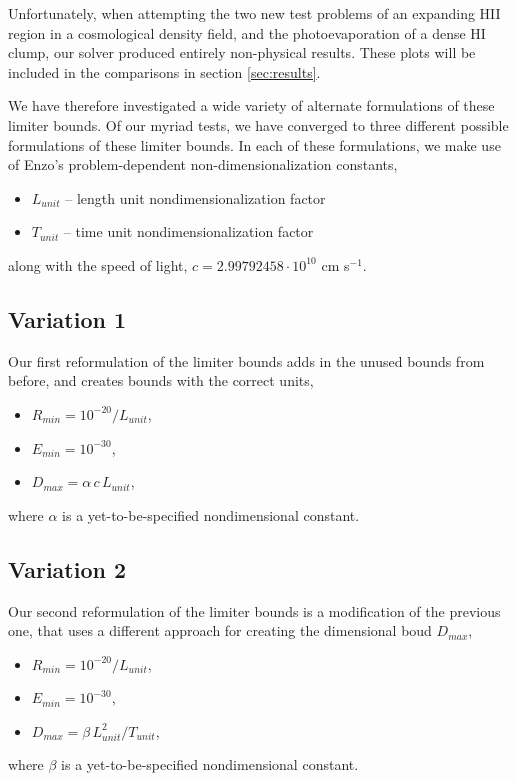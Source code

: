 \documentclass[letterpaper,11pt]{article}
\begin{document}
Unfortunately, when attempting the two new test problems of an
expanding HII region in a cosmological density field, and the
photoevaporation of a dense HI clump, our solver produced entirely
non-physical results.  These plots will be included in the comparisons
in section \ref{sec:results}.  

We have therefore investigated a wide variety of alternate
formulations of these limiter bounds.  Of our myriad tests, we have
converged to three different possible formulations of these limiter
bounds.  In each of these formulations, we make use of Enzo's
problem-dependent non-dimensionalization constants,
\begin{itemize}
\item $L_{unit}$ -- length unit nondimensionalization factor
\item $T_{unit}$ -- time unit nondimensionalization factor
\end{itemize}
along with the speed of light, $c=2.99792458\cdot 10^{10}$ cm
s$^{-1}$. 



\subsection{Variation 1}
\label{sec:var1}

Our first reformulation of the limiter bounds adds in the unused bounds
from before, and creates bounds with the correct units,
\begin{itemize}
\item $R_{min} = 10^{-20} / L_{unit}$,
\item $E_{min} = 10^{-30}$,
\item $D_{max} = \alpha\, c\, L_{unit}$,
\end{itemize}
where $\alpha$ is a yet-to-be-specified nondimensional constant.


\subsection{Variation 2}
\label{sec:var2}

Our second reformulation of the limiter bounds is a modification of the
previous one, that uses a different approach for creating the
dimensional boud $D_{max}$,
\begin{itemize}
\item $R_{min} = 10^{-20} / L_{unit}$,
\item $E_{min} = 10^{-30}$,
\item $D_{max} = \beta\, L_{unit}^2 / T_{unit}$,
\end{itemize}
where $\beta$ is a yet-to-be-specified nondimensional constant.
\end{document}
